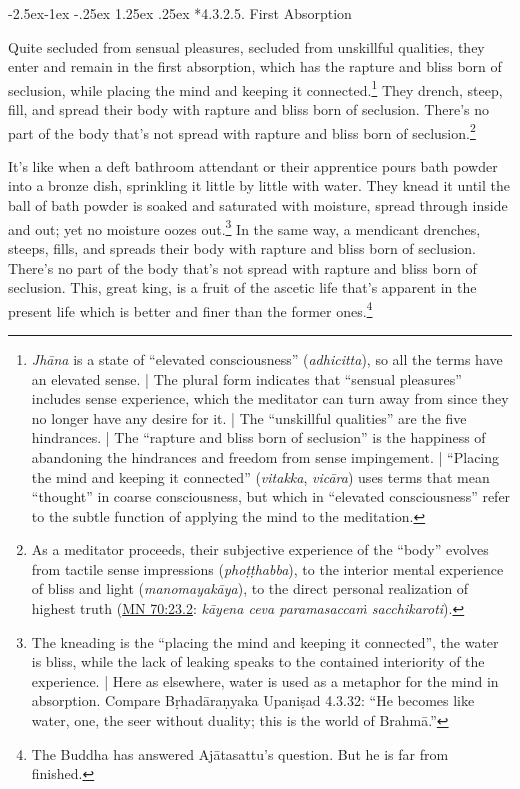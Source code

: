 \documentclass[12pt,openany]{book}%
\makeatletter
\renewcommand\paragraph{\@startsection{paragraph}{4}{\z@}%
            {-2.5ex\@plus -1ex \@minus -.25ex}%
            {1.25ex \@plus .25ex}%
            {\noindent\normalfont\itshape\small}}
\makeatother
\begin{document}
\paragraph*{4.3.2.5. First Absorption }

Quite secluded from sensual pleasures, secluded from unskillful qualities, they enter and remain in the first absorption, which has the rapture and bliss born of seclusion, while placing the mind and keeping it connected.\footnote{\textit{\textsanskrit{Jhāna}} is a state of “elevated consciousness” (\textit{adhicitta}), so all the terms have an elevated sense. | The plural form indicates that “sensual pleasures” includes sense experience, which the meditator can turn away from since they no longer have any desire for it. | The “unskillful qualities” are the five hindrances. | The “rapture and bliss born of seclusion” is the happiness of abandoning the hindrances and freedom from sense impingement. | “Placing the mind and keeping it connected” (\textit{vitakka}, \textit{\textsanskrit{vicāra}}) uses terms that mean “thought” in coarse consciousness, but which in “elevated consciousness” refer to the subtle function of applying the mind to the meditation. } They drench, steep, fill, and spread their body with rapture and bliss born of seclusion. There’s no part of the body that’s not spread with rapture and bliss born of seclusion.\footnote{As a meditator proceeds, their subjective experience of the “body” evolves from tactile sense impressions (\textit{\textsanskrit{phoṭṭhabba}}), to the interior mental experience of bliss and light (\textit{\textsanskrit{manomayakāya}}), to the direct personal realization of highest truth (\href{https://suttacentral.net/mn70/en/sujato\#23.2}{MN 70:23.2}: \textit{\textsanskrit{kāyena} ceva \textsanskrit{paramasaccaṁ} sacchikaroti}). } 

It’s like when a deft bathroom attendant or their apprentice pours bath powder into a bronze dish, sprinkling it little by little with water. They knead it until the ball of bath powder is soaked and saturated with moisture, spread through inside and out; yet no moisture oozes out.\footnote{The kneading is the “placing the mind and keeping it connected”, the water is bliss, while the lack of leaking speaks to the contained interiority of the experience. | Here as elsewhere, water is used as a metaphor for the mind in absorption. Compare \textsanskrit{Bṛhadāraṇyaka} \textsanskrit{Upaniṣad} 4.3.32: “He becomes like water, one, the seer without duality; this is the world of \textsanskrit{Brahmā}.” } In the same way, a mendicant drenches, steeps, fills, and spreads their body with rapture and bliss born of seclusion. There’s no part of the body that’s not spread with rapture and bliss born of seclusion. This, great king, is a fruit of the ascetic life that’s apparent in the present life which is better and finer than the former ones.\footnote{The Buddha has answered \textsanskrit{Ajātasattu}’s question. But he is far from finished. } 
\end{document}
